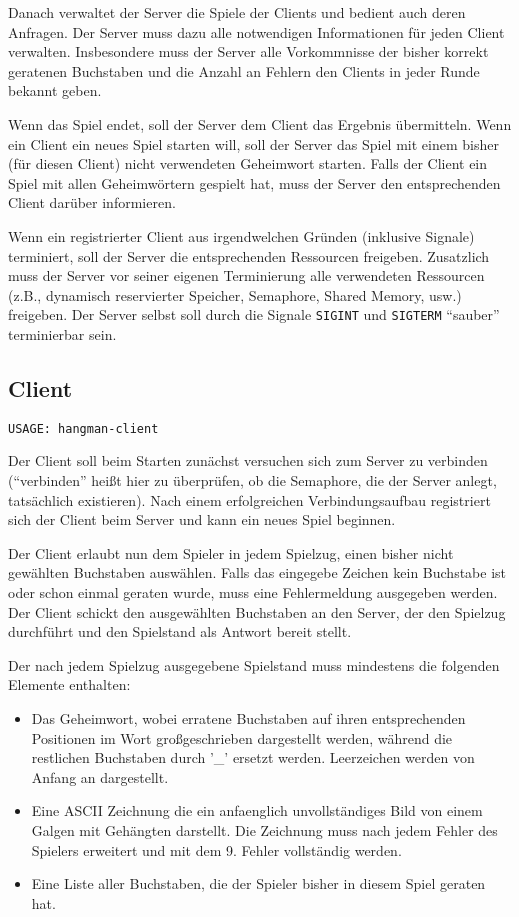 Danach verwaltet der Server die Spiele der Clients und bedient auch deren
Anfragen.  Der Server muss dazu alle notwendigen Informationen für jeden Client
verwalten. Insbesondere muss der Server alle Vorkommnisse der bisher korrekt
geratenen Buchstaben und die Anzahl an Fehlern den Clients in jeder Runde
bekannt geben.

Wenn das Spiel endet, soll der Server dem Client das Ergebnis übermitteln.
Wenn ein Client ein neues Spiel starten will, soll der Server das Spiel mit
einem bisher (für diesen Client) nicht verwendeten Geheimwort starten.  Falls
der Client ein Spiel mit allen Geheimwörtern gespielt hat, muss der Server den
entsprechenden Client darüber informieren.

Wenn ein registrierter Client aus irgendwelchen Gründen (inklusive Signale)
terminiert, soll der Server die entsprechenden Ressourcen freigeben.
Zusatzlich muss der Server vor seiner eigenen Terminierung alle
verwendeten Ressourcen (z.B., dynamisch reservierter Speicher, Semaphore,
Shared Memory, usw.) freigeben.  Der Server selbst soll durch die Signale
\verb|SIGINT| und \verb|SIGTERM| "`sauber"' terminierbar sein.



\subsection*{Client}

\begin{verbatim}
USAGE: hangman-client
\end{verbatim}

Der Client soll beim Starten zunächst versuchen sich zum Server zu verbinden
("`verbinden"' heißt hier zu überprüfen, ob die Semaphore, die der Server
anlegt, tatsächlich existieren).  Nach einem erfolgreichen Verbindungsaufbau
registriert sich der Client beim Server und kann ein neues Spiel beginnen.

Der Client erlaubt nun dem Spieler in jedem Spielzug, einen bisher nicht
gewählten Buchstaben auswählen.  Falls das eingegebe Zeichen kein Buchstabe ist
oder schon einmal geraten wurde, muss eine Fehlermeldung ausgegeben werden. Der
Client schickt den ausgewählten Buchstaben an den Server, der den Spielzug
durchführt und den Spielstand als Antwort bereit stellt.

Der nach jedem Spielzug ausgegebene Spielstand muss mindestens die folgenden
Elemente enthalten:

\begin{itemize}
  \item Das Geheimwort, wobei erratene Buchstaben auf ihren entsprechenden
        Positionen im Wort großgeschrieben dargestellt werden, während die
        restlichen Buchstaben durch '\_' ersetzt werden.
        Leerzeichen werden von Anfang an dargestellt.
  \item Eine ASCII Zeichnung die ein anfaenglich unvollständiges Bild von einem
        Galgen mit Gehängten darstellt. Die Zeichnung muss nach jedem Fehler
        des Spielers erweitert und mit dem 9. Fehler vollständig werden.
  \item Eine Liste aller Buchstaben, die der Spieler bisher in diesem Spiel
        geraten hat.
\end{itemize}

